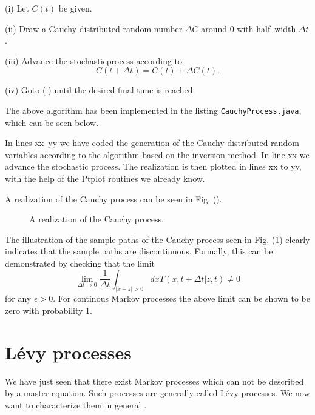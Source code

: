 (i) Let $C(t)$ be given.

(ii) Draw a Cauchy distributed random number $\Delta C$ around 0 with
half--width $\Delta t$.

(iii) Advance the stochasticprocess according to 
\begin{displaymath}
  C(t+\Delta t) = C(t) + \Delta C(t).
\end{displaymath}

(iv) Goto (i) until the desired final time is reached.

The above algorithm has been implemented in the listing
\verb|CauchyProcess.java|, which can be seen below.



In lines xx--yy we have coded the generation of the Cauchy distributed random
variables according to the algorithm based on the inversion method. In line
xx we advance the stochastic process. The realization is then plotted in lines
xx to yy, with the help of the Ptplot routines we already know.

A realization of the Cauchy process can be seen in Fig. ().
\begin{figure}[htbp]
  \begin{center}
    \caption{A realization of the Cauchy process.}
    \label{fig:CauchyRealization}
  \end{center}
\end{figure}

The illustration of the sample paths of the Cauchy process seen in Fig. 
(\ref{fig:CauchyRealization}) clearly indicates that the sample paths are
discontinuous. Formally, this can be demonstrated by checking that the limit
\begin{displaymath}
  \lim_{\Delta t \rightarrow 0} \frac{1}{\Delta t} 
         \int_{|x-z| >0} dx T(x,t+\Delta t| z,t) \neq 0
\end{displaymath}
for any $\epsilon >0$. For continous Markov processes the above limit can be
shown to be zero with probability 1.





\section{L\'evy processes}
We have just seen that there exist Markov processes which can not be described
by a master equation. Such processes are generally called L\'evy
processes. We now want to characterize them in general \cite{Montroll}.

